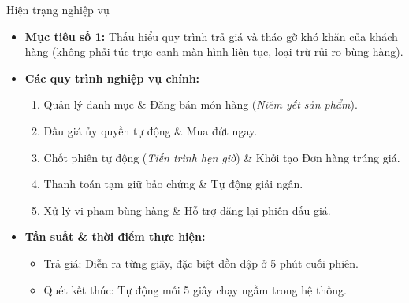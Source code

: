 \documentclass[aspectratio=169, 10pt]{beamer}
\begin{document}
\begin{frame}{Hiện trạng nghiệp vụ}
    \begin{itemize}
        \item \textbf{Mục tiêu số 1:} Thấu hiểu quy trình trả giá và tháo gỡ khó khăn của khách hàng (không phải túc trực canh màn hình liên tục, loại trừ rủi ro bùng hàng).
        \item \textbf{Các quy trình nghiệp vụ chính:}
        \begin{enumerate}
            \item Quản lý danh mục \& Đăng bán món hàng (\textit{Niêm yết sản phẩm}).
            \item Đấu giá ủy quyền tự động \& Mua đứt ngay.
            \item Chốt phiên tự động (\textit{Tiến trình hẹn giờ}) \& Khởi tạo Đơn hàng trúng giá.
            \item Thanh toán tạm giữ bảo chứng \& Tự động giải ngân.
            \item Xử lý vi phạm bùng hàng \& Hỗ trợ đăng lại phiên đấu giá.
        \end{enumerate}
        \item \textbf{Tần suất \& thời điểm thực hiện:}
        \begin{itemize}
            \item Trả giá: Diễn ra từng giây, đặc biệt dồn dập ở 5 phút cuối phiên.
            \item Quét kết thúc: Tự động mỗi 5 giây chạy ngầm trong hệ thống.
        \end{itemize}
    \end{itemize}
\end{frame}
\end{document}
